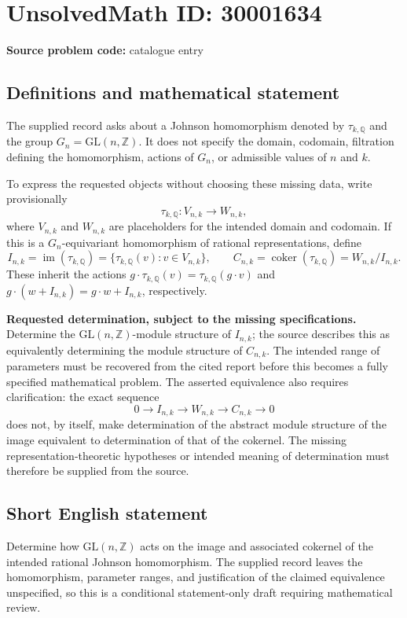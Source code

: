 \documentclass[11pt]{article}
\newcommand{\Z}{\mathbb{Z}}
\newcommand{\Q}{\mathbb{Q}}
\begin{document}
\section*{UnsolvedMath ID: 30001634}
\textbf{Source problem code:} catalogue entry
\subsection{Definitions and mathematical statement}
The supplied record asks about a Johnson homomorphism denoted by \(\tau_{k,\Q}\) and the group \(G_n=\mathrm{GL}(n,\Z)\). It does not specify the domain, codomain, filtration defining the homomorphism, actions of \(G_n\), or admissible values of \(n\) and \(k\).

To express the requested objects without choosing these missing data, write provisionally
\[
\tau_{k,\Q}\colon V_{n,k}\longrightarrow W_{n,k},
\]
where \(V_{n,k}\) and \(W_{n,k}\) are placeholders for the intended domain and codomain. If this is a \(G_n\)-equivariant homomorphism of rational representations, define
\[
I_{n,k}=\operatorname{im}(\tau_{k,\Q})
=\{\tau_{k,\Q}(v):v\in V_{n,k}\},
\qquad
C_{n,k}=\operatorname{coker}(\tau_{k,\Q})
=W_{n,k}/I_{n,k}.
\]
These inherit the actions \(g\cdot\tau_{k,\Q}(v)=\tau_{k,\Q}(g\cdot v)\) and \(g\cdot(w+I_{n,k})=g\cdot w+I_{n,k}\), respectively.

\textbf{Requested determination, subject to the missing specifications.} Determine the \(\mathrm{GL}(n,\Z)\)-module structure of \(I_{n,k}\); the source describes this as equivalently determining the module structure of \(C_{n,k}\). The intended range of parameters must be recovered from the cited report before this becomes a fully specified mathematical problem. The asserted equivalence also requires clarification: the exact sequence
\[
0\longrightarrow I_{n,k}\longrightarrow W_{n,k}\longrightarrow C_{n,k}\longrightarrow 0
\]
does not, by itself, make determination of the abstract module structure of the image equivalent to determination of that of the cokernel. The missing representation-theoretic hypotheses or intended meaning of determination must therefore be supplied from the source.
\subsection{Short English statement}
Determine how \(\mathrm{GL}(n,\Z)\) acts on the image and associated cokernel of the intended rational Johnson homomorphism. The supplied record leaves the homomorphism, parameter ranges, and justification of the claimed equivalence unspecified, so this is a conditional statement-only draft requiring mathematical review.
\end{document}
